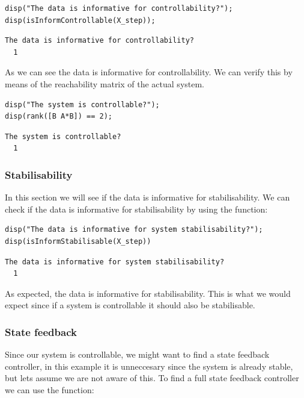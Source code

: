 \begin{lstlisting}
disp("The data is informative for controllability?");
disp(isInformControllable(X_step));
\end{lstlisting}

\begin{verbatim}
The data is informative for controllability?
  1
\end{verbatim}

As we can see the data is informative for controllability. We can verify this by means of the reachability matrix of the actual system.

\begin{lstlisting}
disp("The system is controllable?");
disp(rank([B A*B]) == 2);
\end{lstlisting}

\begin{verbatim}
The system is controllable?
  1
\end{verbatim}

\subsubsection{Stabilisability}
In this section we will see if the data is informative for stabilisability. We can check if the data is informative for stabilisability by using the function:
\begin{center}
\end{center} 

\begin{lstlisting}
disp("The data is informative for system stabilisability?");
disp(isInformStabilisable(X_step))
\end{lstlisting}

\begin{verbatim}
The data is informative for system stabilisability?
  1
\end{verbatim}

As expected, the data is informative for stabilisability. This is what we would expect since if a system is controllable it should also be stabilisable.

\subsubsection{State feedback}
Since our system is controllable, we might want to find a state feedback controller, in this example it is unneccesary since the system is already stable, but lets assume we are not aware of this. To find a full state feedback controller we can use the function:
\begin{center}
\end{center} 

